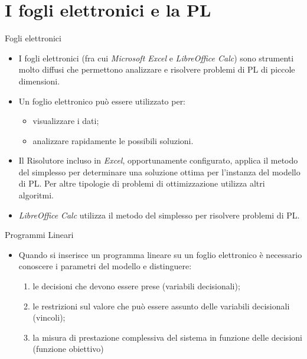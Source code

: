 \documentclass{beamer}
\begin{document}
\generatitolo

\section{I fogli elettronici e la PL}

\begin{frame}{Fogli elettronici}
\begin{itemize}
\item I fogli elettronici (fra cui \emph{Microsoft Excel} e \emph{LibreOffice Calc}) sono
strumenti molto diffusi che permettono analizzare e risolvere
problemi di PL di piccole dimensioni.

\item Un foglio elettronico pu\`o essere utilizzato per:
\begin{itemize}
	\item visualizzare i dati;
	\item analizzare rapidamente le possibili soluzioni.
\end{itemize}

\item Il Risolutore incluso in \emph{Excel}, opportunamente configurato,
applica il metodo del simplesso per determinare una soluzione ottima
per l'instanza del modello di PL. Per altre tipologie di problemi di
ottimizzazione utilizza altri algoritmi.

\item \emph{LibreOffice} \emph{Calc} utilizza il metodo del
simplesso per risolvere problemi di PL.
\end{itemize}
\end{frame}

\begin{frame}{Programmi Lineari}
\begin{itemize}
\item Quando si inserisce un programma lineare su un foglio elettronico
\`e necessario conoscere i parametri del modello e distinguere:
\begin{enumerate}
\item le decisioni che devono essere prese (\alert{variabili decisionali});
\item le restrizioni sul valore che pu\`o essere assunto delle variabili
	decisionali (\alert{vincoli});
\item la misura di prestazione complessiva del sistema in funzione delle decisioni (\alert{funzione obiettivo})
\end{enumerate}
\end{itemize}
\end{frame}
\end{document}
